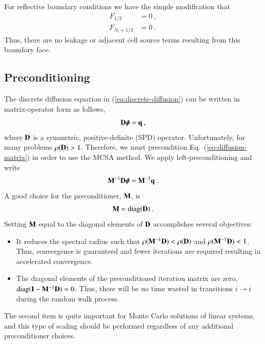 \documentclass[preprint,12pt]{elsarticle}
\newcommand{\vI}{\ensuremath{\ve{I}}}
\newcommand{\bphi}{\ensuremath{\boldsymbol{\phi}}}
\DeclareMathOperator{\diag}{diag}
\begin{document}
For reflective boundary conditions we have the simple modification
that
\begin{align}
  F_{1/2} &= 0\:, \\
  F_{N_l+1/2} &= 0\:.
\end{align}
Thus, there are no leakage or adjacent cell source terms resulting
from this boundary face.

\subsection{Preconditioning}
\label{sec:preconditioning}

The discrete diffusion equation in (\ref{eq:discrete-diffusion}) can
be written in matrix-operator form as follows,
\begin{equation}
  \ve{D}\bphi = \ve{q}\:,
  \label{eq:diffusion-matrix}
\end{equation}
where $\mathbf{D}$ is a symmetric, positive-definite (SPD) operator.
Unfortunately, for many problems $\rho(\mathbf{D}) > 1$.  Therefore, we
must precondition Eq.~(\ref{eq:diffusion-matrix}) in order to use the
MCSA method. We apply left-preconditioning and write
\begin{equation}
  \ve{M}^{-1}\ve{D}\bphi = \ve{M}^{-1}\ve{q}\:.
  \label{eq:preconditioned-diffusion}
\end{equation}
A good choice for the preconditioner, $\mathbf{M}$, is
\begin{equation}
  \ve{M}=\diag(\ve{D})\:.
  \label{eq:preconditioner}
\end{equation}
Setting $\mathbf{M}$ equal to the diagonal elements of $\mathbf{D}$
accomplishes several objectives:
\begin{itemize}
\item It reduces the spectral radius such that
  $\rho(\mathbf{M}^{-1}\mathbf{D}) < \rho(\mathbf{D})$ and
  $\rho(\mathbf{M}^{-1}\mathbf{D}) < 1$.  Thus, convergence is guaranteed and
  fewer iterations are required resulting in accelerated convergence.
\item The diagonal elements of the preconditioned iteration matrix are
  zero, $\diag(\vI - \ve{M}^{-1}\ve{D}) = 0$.  Thus, there will be no
  time wasted in transitions $i\rightarrow i$ during the random walk
  process.
\end{itemize}
The second item is quite important for Monte Carlo solutions of linear
systems, and this type of scaling should be performed regardless of
any additional preconditioner choices.  
\end{document}
